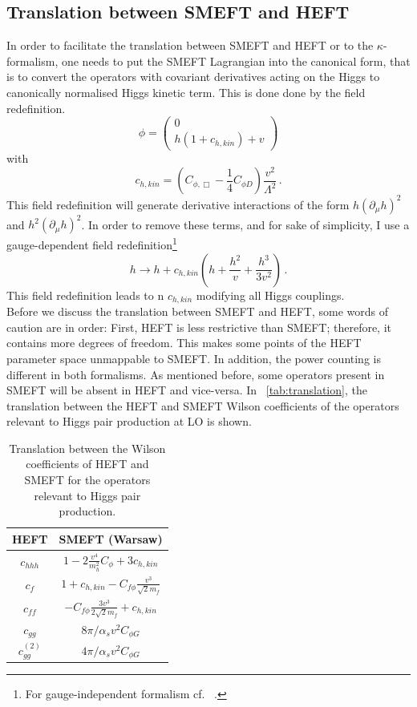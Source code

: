 \subsection{Translation between SMEFT and HEFT }
In order to facilitate the translation between SMEFT and HEFT or to the $\kappa$-formalism, one needs to put the SMEFT Lagrangian into the canonical form, that is to convert the operators with covariant derivatives acting on the Higgs to  canonically normalised Higgs kinetic term. This is done done by the field redefinition.
\begin{equation}
	\phi=\left( \begin{array}{c} 0 \\ h(1+c_{h,kin}) + v \end{array} \right)
\end{equation} 
with 
\begin{equation}
	c_{h,kin}=\left(C_{\phi,\Box}-\frac{1}{4}C_{\phi D}\right) \frac{v^2}{\Lambda^2}\,.
\end{equation}
This field redefinition will generate derivative interactions of the form $h(\partial_{\mu}h)^2$ and $h^2(\partial_{\mu}h)^2$. In order to remove these terms, and for sake of simplicity, I use a gauge-dependent field redefinition\footnote{For gauge-independent formalism cf.~ \cite{Hartmann:2015aia}.}
\begin{equation}
	h \to h + c_{h,kin}\left( h +\frac{h^2}{v}+\frac{h^3}{3v^2}\right)\,. \label{fieldref}
\end{equation}
This field redefinition leads to n $c_{h,kin}$ modifying all Higgs couplings. \\
Before we discuss the translation between SMEFT and HEFT, some words of caution are in order: First, HEFT is less restrictive than SMEFT; therefore, it contains more degrees of freedom. This makes some points of the HEFT parameter space unmappable to SMEFT. In addition, the power counting is different in both formalisms. As mentioned before, some operators present in SMEFT will be absent in HEFT and vice-versa.  In ~\autoref{tab:translation}, the translation between the HEFT and SMEFT Wilson coefficients of the operators relevant to Higgs pair production at LO is shown. 
\begin{table}[htb]
	\begin{center}
		\begin{tabular}{ c c }
			\toplinetwo
			HEFT& SMEFT (Warsaw)\\
			\midrule
			$c_{hhh}$&$1-2\frac{v^4}{m_h^2}C_\phi+3c_{h,kin}$ \\
			$c_f$ & $1+c_{h,kin} -C_{f\phi} \frac{v^3}{\sqrt{2} m_f}$\\
			$ c_{ff} $ &$-C_{f\phi} \frac{3 v^3}{2\sqrt{2} m_f} + c_{h,kin}$\\
			$c_{gg}$  & $8\pi/\alpha_s v^2 C_{\phi G}$ \\
			$c_{gg}^{(2)}$  & $4\pi/\alpha_s v^2 C_{\phi G}$ \\
			\bottomrule
		\end{tabular}
	\end{center}
	\caption{Translation between the Wilson coefficients of HEFT and SMEFT for the operators relevant to Higgs pair production. \label{tab:translation}}
\end{table}
